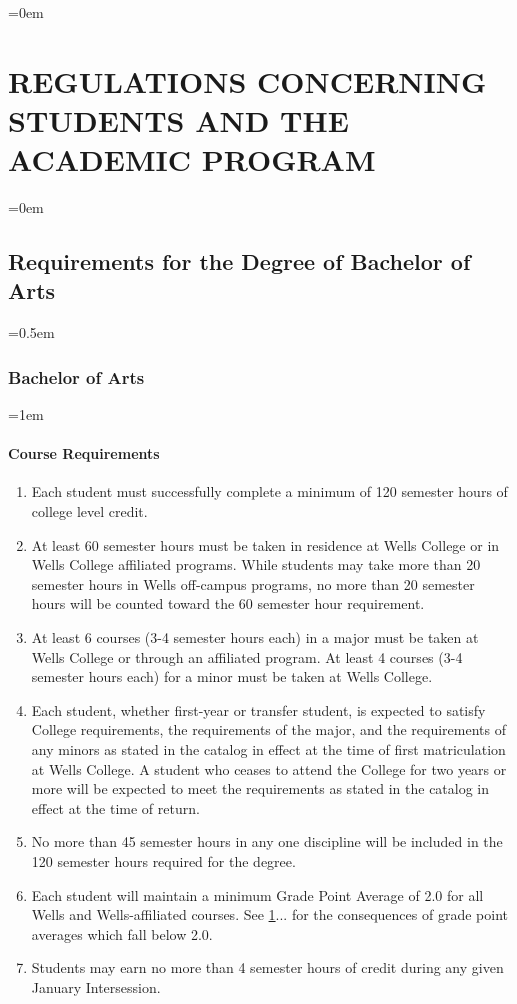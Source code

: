 \documentclass{manual}
\newcommand{\modified}[1]{}
\let\stdsection\section %
\renewcommand\section{\newpage\stdsection}
\let\oldsection\section
\renewcommand\section{\leftskip=0em\oldsection}
\let\oldsubsection\subsection
\renewcommand\subsection{\leftskip=0em\oldsubsection}
\let\oldsubsubsection\subsubsection
\renewcommand\subsubsection{\leftskip=0.5em\oldsubsubsection}
\let\oldparagraph\paragraph
\renewcommand\paragraph{\leftskip=1em\oldparagraph}
\newcommand{\itemLevelA}{\alph*.}
\newcommand{\itemRefA}{\alph*}
\begin{document}
\section{REGULATIONS CONCERNING STUDENTS AND THE ACADEMIC PROGRAM}\label{art:RegulationsConcerningStudentStatus}

\subsection{Requirements for the Degree of Bachelor of Arts}

\subsubsection{Bachelor of Arts}

\paragraph{Course Requirements}

\begin{enumerate}[label=\itemLevelA,ref=\itemRefA]
\item Each student must successfully complete a minimum of 120 semester\modified{5/13/93} hours of college level credit.
\item At least 60 semester hours must be taken in residence at Wells College\modified{5/13/93} or in Wells College affiliated programs. While students may take more than 20 semester hours in Wells off-campus programs, no more than 20 semester hours will be counted toward the 60 semester hour requirement.
\item At least 6 courses (3-4 semester hours each) in a major must be taken at Wells College or through an affiliated program. At least 4 courses (3-4 semester hours each) for a minor must be taken at Wells College.
\item Each student, whether first-year or transfer student, is expected to satisfy College requirements, the requirements of the major, and the requirements \modified{4/8/97} of any minors as stated in the catalog in effect at the time of first matriculation at Wells College. A student who ceases to attend the College for two years or more will be expected to meet the requirements as stated in the catalog in effect at the time of return.
\item No more than 45 semester hours in any one discipline will be included \modified{5/13/93}  in the 120 semester hours required for the degree.
\item Each student will maintain a minimum Grade Point Average of 2.0 for all Wells and Wells-affiliated courses. See \cref{art:RegulationsConcerningStudentStatus}... for the consequences of grade point averages which fall below 2.0.
\item Students may earn no more than 4 semester hours of credit during any given January  Intersession.\modified{2/8/05}
\end{enumerate}
\end{document}
